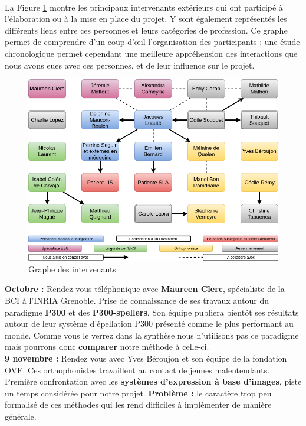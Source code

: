 \documentclass[11pt,a4paper]{article}
\theoremstyle{plain}
\theoremstyle{definition}
\begin{document}
\paragraph{} La Figure \ref{grapheIntervenants} montre les principaux intervenants extérieurs qui ont participé à l'élaboration ou à la mise en place du projet. Y sont également représentés les différents liens entre ces personnes et leurs catégories de profession. Ce graphe permet de comprendre d'un coup d'\oe il l'organisation des participants ; une étude chronologique permet cependant une meilleure appréhension des interactions que nous avons eues avec ces personnes, et de leur influence sur le projet.
\begin{figure}[h!]
\centering \includegraphics[width=16.4cm]{images/grapheIntervenants.png}
\caption{Graphe des intervenants}
\label{grapheIntervenants}
\end{figure}

\textbf{Octobre : } Rendez vous téléphonique avec \textbf{Maureen Clerc}, spécialiste de la BCI à l'INRIA Grenoble. Prise de connaissance de ses travaux autour du paradigme \textbf{P300} et des \textbf{P300-spellers}. Son équipe publiera bientôt ses résultats autour de leur système d'épellation P300 présenté comme le plus performant au monde. Comme vous le verrez dans la synthèse nous n'utilisons pas ce paradigme mais pourrons donc \textbf{comparer} notre méthode à celle-ci.\\

\textbf{9 novembre : } Rendez vous avec Yves Béroujon et son équipe de la fondation OVE. Ces orthophonistes travaillent au contact de jeunes malentendants. Première confrontation avec les \textbf{systèmes d'expression à base d'images}, piste un temps considérée pour notre projet.  \textbf{Problème :} le caractère trop peu formalisé de ces méthodes qui les rend difficiles à implémenter de manière générale. \\
\end{document}
